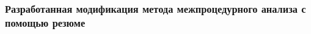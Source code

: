 \documentclass[10pt,gray]{beamer}
\begin{document}

\begin{frame}
\frametitle{Разработанная модификация метода межпроцедурного анализа с помощью резюме}
\begin{figure}[h]
\end{figure}
\end{frame}
\end{document}
